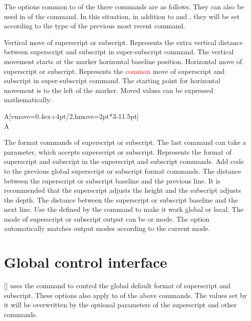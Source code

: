 \documentclass[load-preamble+]{cnltx-doc}
\renewcommand{\emph}[1]{\textcolor{red}{#1}}
\begin{document}
The options common to  of the three commands are as follows. They can also be used in  of the  command. In this situation, in addition to  and , they will be set according to the type of the previous most recent command.
\begin{options}
  \Default{0pt}
  Vertical move of superscript or subscript. Represents the extra vertical distance  between superscript and subscript in super-subscript command. The vertical movement starts at the marker horizontal baseline position.
  \Default{0pt}
  Horizontal move of superscript or subscript. Represents the \emph{common} move of superscript and subscript in super-subscript command. The starting point for horizontal movement is to the left of the marker. Moved values can be expressed mathematically:
  \begin{example}
  A[vmove=0.4ex+4pt/2,hmove=2pt*3-11.5pt] \\
  A
  \end{example}
  The format commands of superscript or subscript. The last command can take a parameter, which accepts superscript or subscript. Represents the format of superscript and subscript in the superscript and subscript commands.
  Add code to the previous global superscript or subscript format commands.
  The distance between the superscript or subscript baseline and the previous line. It is recommended that the superscript adjusts the height and the subscript adjusts the depth.
  The distance between the superscript or subscript baseline and the next line.
  Use the  defined by the  command to make it work global or local.
  The mode of superscript or subscript output can be  or  mode. The  option automatically matches output modes according to the current mode.
\end{options}

\section{Global control interface}
\label{sec:global control interface}
\begin{commands}
  []
   uses the  command to control the global default format of superscript and subscript. These options also apply to  of the above commands. The values ​​set by it will be overwritten by the optional parameters of the superscript and other commands.
\end{commands}
\end{document}
